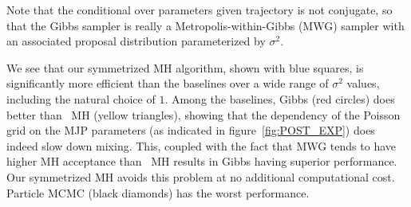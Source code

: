   Note that the conditional over parameters given trajectory is not conjugate, so that the Gibbs sampler is really a Metropolis-within-Gibbs (MWG) sampler with an associated proposal distribution parameterized by $\sigma^2$.

  We see that our symmetrized MH algorithm, shown with blue squares, is significantly more efficient than the baselines over a wide range of $\sigma^2$ values, including the natural choice of $1$.
  Among the baselines, Gibbs (red circles) does better than \naive\ MH (yellow triangles), showing that the dependency of the Poisson grid on the MJP parameters (as indicated in figure~\ref{fig:POST_EXP}) does indeed slow down mixing. 
 This, coupled with the fact that MWG tends to have higher MH acceptance than \naive\ MH results in Gibbs having superior performance. 
  Our symmetrized MH avoids this problem at no additional computational cost.
  Particle MCMC (black diamonds) has the worst performance. 


